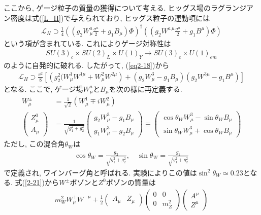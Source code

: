 \documentclass[uplatex,dvipdfmx,a4paper,titlepage]{jsbook}
\theoremstyle{plain}
\theoremstyle{definition}
\begin{document}
ここから, ゲージ粒子の質量の獲得について考える.
ヒッグス場のラグランジアン密度は式(\ref{L_H})で与えられており, ヒッグス粒子の運動項には
\begin{align}
  \mathcal{L}_H \supset \frac{1}{4}\left((g_2W^a_\mu\frac{\sigma^a}{2}+g_1B_\mu)\Phi\right)^\dagger \left((g_2W^{a\,\mu}\frac{\sigma^a}{2}+g_1B^\mu)\Phi\right)\label{eq2-18}
\end{align}
という項が含まれている.
これによりゲージ対称性は
\begin{align}
  SU(3)_c\times SU(2)_L\times U(1)_Y \rightarrow SU(3)_c\times U(1)_{em}
\end{align}
のように自発的に破れる.
したがって, (\ref{eq2-18})から
\begin{align}
  \mathcal{L}_H \supset \frac{v^2}{8}\left[\left(g_2^2(W^1_\mu  W^{1\mu}+W^2_\mu  W^{2\mu}\right)+ (g_2W_\mu^3 -g_1B_\mu)(g_2W^{3\mu}-g_1 B^{\mu})\right] \label{2-21}
\end{align}
となる.
ここで, ゲージ場$W_\mu^a$と$B_\mu$を次の様に再定義する.
\begin{align}
  W_\mu^\pm &= \frac{1}{\sqrt{2}}(W_\mu ^1 \mp i W_\mu^2)\\
  \left(\begin{array}{c}
      Z_\mu^0 \\
      A_\mu
      \end{array}\right)&=\frac{1}{\sqrt{g_1^2+g_2^2}}\left(\begin{array}{c}
      g_2 W_\mu^3-g_1 B_\mu \\
      g_1 W_\mu^3-g_2 B_\mu 
    \end{array}\right)
    \equiv \left(\begin{array}{cc}
        \cos\theta_W W_\mu^3 - \sin\theta_W B_\mu \\
        \sin\theta_W W_\mu^3 + \cos\theta_W B_\mu
      \end{array}
    \right)\label{eq2-22}
\end{align}
ただし, この混合角$\theta_W$は
\begin{align}
  \cos\theta_W = \frac{g_2}{\sqrt{g_1^2 + g_2^2}},\quad \sin\theta_W = \frac{g_1}{\sqrt{g_1^2 + g_2^2}}\nonumber
\end{align}
で定義され, ワインバーグ角と呼ばれる.
実験によりこの値は$\sin^2\theta_W \simeq 0.23$となる.
式(\ref{2-21})から$W^\pm$ボゾンと$Z^0$ボゾンの質量は
\begin{align}
  m_W^2 W_\mu^+W^{-\mu} + \frac{1}{2}\left(\begin{array}{cc}
      A_\mu & Z_\mu
    \end{array}\right) \left(\begin{array}{cc}
      0 & 0 \\
      0 & m_Z^2 
      \end{array}\right)\left(\begin{array}{c}
      A^\mu \\
      Z^\mu
  \end{array}\right)\label{eq2-23}
\end{align}
\end{document}

